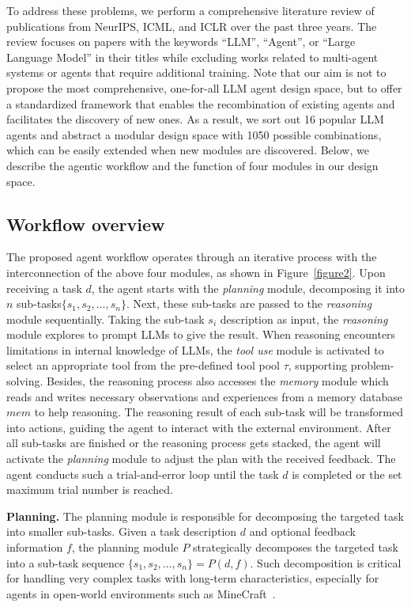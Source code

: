 To address these problems, we perform a comprehensive literature review of publications from NeurIPS, ICML, and ICLR over the past three years. 
The review focuses on papers with the keywords ``LLM'', ``Agent'', or ``Large Language Model'' in their titles while excluding works related to multi-agent systems or agents that require additional training.
Note that our aim is not to propose the most comprehensive, one-for-all LLM agent design space, but to offer a standardized framework that enables the recombination of existing agents and facilitates the discovery of new ones.
As a result, we sort out 16 popular LLM agents and abstract a modular design space with 1050 possible combinations, which can be easily extended when new modules are discovered.
Below, we describe the agentic workflow and the function of four modules in our design space.

\subsection{Workflow overview}
The proposed agent workflow operates through an iterative process with the interconnection of the above four modules, as shown in Figure~\ref{figure2}. 
Upon receiving a task $d$, the agent starts with the \emph{planning} module, decomposing it into $n$ sub-tasks$\{s_1, s_2, \dots, s_n\}$. 
Next, these sub-tasks are passed to the \emph{reasoning} module sequentially.
Taking the sub-task $s_i$ description as input, the \emph{reasoning} module explores to prompt LLMs to give the result.
When reasoning encounters limitations in internal knowledge of LLMs, the \emph{tool use} module is activated to select an appropriate tool from the pre-defined tool pool $\tau$, supporting problem-solving.
Besides, the reasoning process also accesses the \emph{memory} module which reads and writes necessary observations and experiences from a memory database $mem$ to help reasoning.
The reasoning result of each sub-task will be transformed into actions, guiding the agent to interact with the external environment.
After all sub-tasks are finished or the reasoning process gets stacked, the agent will activate the \emph{planning} module to adjust the plan with the received feedback.
The agent conducts such a trial-and-error loop until the task $d$ is completed or the set maximum trial number is reached.

\textbf{Planning.} 
The planning module is responsible for decomposing the targeted task into smaller sub-tasks. 
Given a task description $d$ and optional feedback information $f$, the planning module $P$ strategically decomposes the targeted task into a sub-task sequence $ \{s_1, s_2, \dots, s_n\} = P(d, f)$.
Such decomposition is critical for handling very complex tasks with long-term characteristics, especially for agents in open-world environments such as MineCraft~\citep{wang2024voyager,wang2024describe}.

